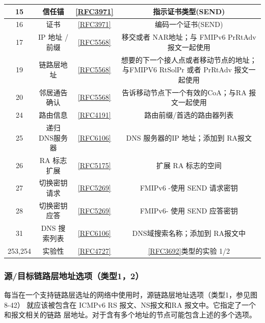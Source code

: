 \begin{table}[]
\begin{tabular}{c|c|c|c}
		15	&	信任锚	&	\href{https://www.rfc-editor.org/rfc/rfc3971}{[RFC3971]}	&	指示证书类型(SEND) \\ \hline
		16	&	证书	&	\href{https://www.rfc-editor.org/rfc/rfc3971}{[RFC3971]}	&	编码一个证书(SEND) \\ \hline
		17	&	IP 地址 /前缀	&	\href{https://www.rfc-editor.org/rfc/rfc5568}{[RFC5568]}	&	移交或者 NAR地址；与 FMIPv6 PrRtAdv报文一起使用 \\ \hline
		19	&	链路层地址	&	\href{https://www.rfc-editor.org/rfc/rfc5568}{[RFC5568]}	&	想要的下一个接人点或者移动节点的地址；与FMIPV6 RtSolPr 或者 PrRtAdv 报文一起使用 \\ \hline
		20	&	邻居通告确认	&	\href{https://www.rfc-editor.org/rfc/rfc5568}{[RFC5568]}	&	告诉移动节点下一个有效的CoA；与RA 报文一起使用 \\ \hline
		24	&	路由信息	&	\href{https://www.rfc-editor.org/rfc/rfc4191}{[RFC4191]}	&	路由前缀/首选的路由器列表 \\ \hline
		25	&	递归 DNS服务器	&	\href{https://www.rfc-editor.org/rfc/rfc6106}{[RFC6106]}	&	DNS 服务器的IP 地址；添加到 RA报文 \\ \hline
		26	&	RA 标志扩展	&	\href{https://www.rfc-editor.org/rfc/rfc5175}{[RFC5175]}	&	扩展 RA 标志的空间 \\ \hline
		27	&	切换密钥请求	&	\href{https://www.rfc-editor.org/rfc/rfc5269}{[RFC5269]}	&	FMIPv6 -使用 SEND 请求密钥 \\ \hline
		28	&	切换密钥应答	&	\href{https://www.rfc-editor.org/rfc/rfc5269}{[RFC5269]}	&	FMIPv6- 使用 SEND 应答密钥 \\ \hline
		31	&	DNS 搜索列表	&	\href{https://www.rfc-editor.org/rfc/rfc6106}{[RFC6106]}	&	DNS域搜索名称；添加到 RA报文中 \\ \hline
		253,254	&	实验性	&	\href{https://www.rfc-editor.org/rfc/rfc4727}{[RFC4727]}	&	\href{https://www.rfc-editor.org/rfc/rfc3692}{[RFC3692]}类型的实验 1/2 \\ \hline
    \end{tabular}
\end{table}

\subsubsection{源/目标链路层地址选项（类型1，2）}

每当在一个支持链路层选址的网络中使用时，源链路层地址选项（类型1，参见图8-42）
就应该被包含在 ICMPv6 RS 报文、NS报文和RA 报文中。它指定了一个和报文相关的链路
层地址。对于含有多个地址的节点可能包含上述的多个选项。


